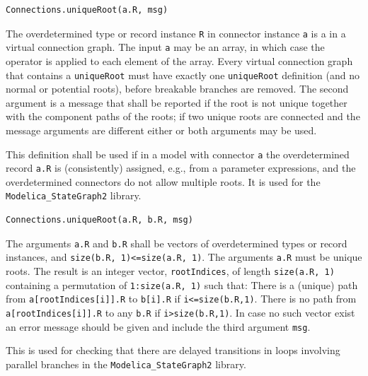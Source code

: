 \begin{operatordefinition}
\begin{synopsis}\begin{lstlisting}
Connections.uniqueRoot(a.R, msg)
\end{lstlisting}\end{synopsis}
\begin{semantics}
The overdetermined type or record instance \lstinline!R! in connector instance \lstinline!a! is a  in a virtual connection graph.
The input \lstinline!a! may be an array, in which case the operator is applied to each element of the array.
Every virtual connection graph that contains a \lstinline!uniqueRoot! must have exactly one \lstinline!uniqueRoot! definition (and no normal or potential roots), before breakable branches are removed.
The second argument is a message that shall be reported if the root is not unique together with the component paths of the roots; if two unique roots are connected and the message arguments are different either or both arguments may be used.

\begin{nonnormative}
This definition shall be used if in a model with connector \lstinline!a! the overdetermined record \lstinline!a.R! is (consistently) assigned, e.g., from a parameter expressions, and the overdetermined connectors do not allow multiple roots.
It is used for the \lstinline!Modelica_StateGraph2! library.
\end{nonnormative}
\end{semantics}
\end{operatordefinition}

\begin{operatordefinition}
\begin{synopsis}\begin{lstlisting}
Connections.uniqueRoot(a.R, b.R, msg)
\end{lstlisting}\end{synopsis}
\begin{semantics}
The arguments \lstinline!a.R! and \lstinline!b.R! shall be vectors of overdetermined types or record instances, and \lstinline!size(b.R, 1)<=size(a.R, 1)!.
The arguments \lstinline!a.R! must be unique roots.
The result is an integer vector, \lstinline!rootIndices!, of length \lstinline!size(a.R, 1)! containing a permutation of \lstinline!1:size(a.R, 1)! such that:
There is a (unique) path from \lstinline!a[rootIndices[i]].R! to \lstinline!b[i].R! if \lstinline!i<=size(b.R,1)!.
There is no path from \lstinline!a[rootIndices[i]].R! to any \lstinline!b.R! if \lstinline!i>size(b.R,1)!.
In case no such vector exist an error message should be given and include the third argument \lstinline!msg!.

\begin{nonnormative}
This is used for checking that there are delayed transitions in loops involving parallel branches in the \lstinline!Modelica_StateGraph2! library.
\end{nonnormative}
\end{semantics}
\end{operatordefinition}

